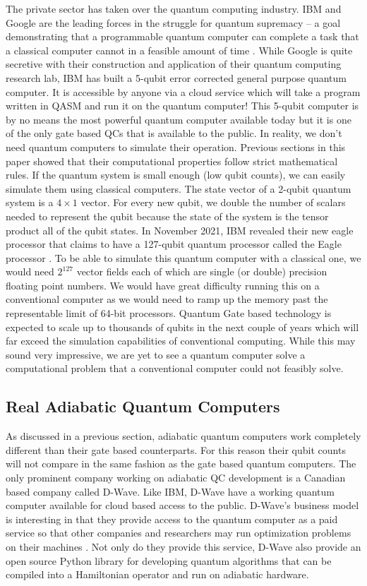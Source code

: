 \documentclass[conference]{IEEEtran}
\begin{document}
The private sector has taken over the quantum computing industry. IBM and Google are the leading forces in the struggle for quantum supremacy -- a goal demonstrating that a programmable quantum computer can complete a task that a classical computer cannot in a feasible amount of time \cite{b14}. While Google is quite secretive with their construction and application of their quantum computing research lab, IBM has built a 5-qubit error corrected general purpose quantum computer. It is accessible by anyone via a cloud service which will take a program written in QASM and run it on the quantum computer! This 5-qubit computer is by no means the most powerful quantum computer available today but it is one of the only gate based QCs that is available to the public. In reality, we don't need quantum computers to simulate their operation. Previous sections in this paper showed that their computational properties follow strict mathematical rules. If the quantum system is small enough (low qubit counts), we can easily simulate them using classical computers. The state vector of a 2-qubit quantum system is a $4\times 1$ vector. For every new qubit, we double the number of scalars needed to represent the qubit because the state of the system is the tensor product all of the qubit states. In November 2021, IBM revealed their new eagle processor that claims to have a 127-qubit quantum processor called the Eagle processor \cite{b15}. To be able to simulate this quantum computer with a classical one, we would need $2^{127}$ vector fields each of which are single (or double) precision floating point numbers. We would have great difficulty running this on a conventional computer as we would need to ramp up the memory past the representable limit of 64-bit processors. Quantum Gate based technology is expected to scale up to thousands of qubits in the next couple of years which will far exceed the simulation capabilities of conventional computing. While this may sound very impressive, we are yet to see a quantum computer solve a computational problem that a conventional computer could not feasibly solve.

\subsection{Real Adiabatic Quantum Computers}

As discussed in a previous section, adiabatic quantum computers work completely different than their gate based counterparts. For this reason their qubit counts will not compare in the same fashion as the gate based quantum computers. The only prominent company working on adiabatic QC development is a Canadian based company called D-Wave. Like IBM, D-Wave have a working quantum computer available for cloud based access to the public. D-Wave's business model is interesting in that they provide access to the quantum computer as a paid service so that other companies and researchers may run optimization problems on their machines \cite{b13}. Not only do they provide this service, D-Wave also provide an open source Python library for developing quantum algorithms that can be compiled into a Hamiltonian operator and run on adiabatic hardware.
\end{document}
